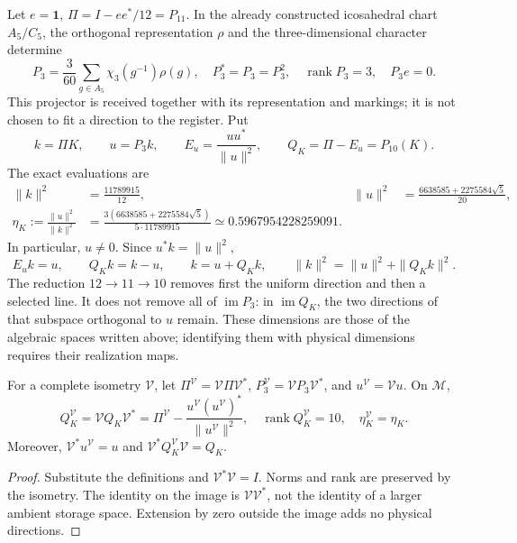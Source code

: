 Let \(e=\mathbf1\), \(\Pi=I-ee^*/12=P_{11}\). In the already constructed
icosahedral chart \(A_5/C_5\), the orthogonal representation
\(\rho\) and the three-dimensional character determine
\begin{equation}
 P_3=\frac3{60}\sum_{g\in A_5}\chi_3(g^{-1})\rho(g),
 \quad P_3^*=P_3=P_3^2,\quad
 \operatorname{rank}P_3=3,\quad P_3e=0.
 \label{x_reciprocidad:lib01:P3}
\end{equation}
This projector is received together with its representation and markings; it is not chosen to fit a direction to the register. Put
\[
 k=\Pi K,\qquad u=P_3k,\qquad
 E_u=\frac{uu^*}{\|u\|^2},\qquad Q_K=\Pi-E_u=P_{10}(K).
\]
The exact evaluations are
\begin{align}
 \|k\|^2&=\frac{11789915}{12},&
 \|u\|^2&=\frac{6638585+2275584\sqrt5}{20},
 \label{x_reciprocidad:lib01:normas-direccion}\\
 \eta_K:=\frac{\|u\|^2}{\|k\|^2}
 &=\frac{3(6638585+2275584\sqrt5)}{5\cdot11789915}
 \simeq0.5967954228259091.
 \label{x_reciprocidad:lib01:eta}
\end{align}
In particular, \(u\ne0\). Since \(u^*k=\|u\|^2\),
\begin{equation}
 E_uk=u,\qquad Q_Kk=k-u,\qquad
 k=u+Q_Kk,\qquad \|k\|^2=\|u\|^2+\|Q_Kk\|^2.
 \label{x_reciprocidad:lib01:particion-direccion}
\end{equation}
The reduction \(12\to11\to10\) removes first the uniform direction and then a selected line. It does not remove all of \(\operatorname{im}P_3\): in \(\operatorname{im}Q_K\), the two directions of that subspace orthogonal to \(u\) remain. These dimensions are those of the algebraic spaces written above; identifying them with physical dimensions requires their realization maps.

\begin{proposition}
\label{x_reciprocidad:lib01:transporte-direccion}
For a complete isometry \(\mathcal V\), let \(\Pi^{\mathcal V}=\mathcal V\Pi\mathcal V^*\), \(P_3^{\mathcal V}=\mathcal VP_3\mathcal V^*\), and \(u^{\mathcal V}=\mathcal Vu\). On \(\mathcal M\),
\[
 Q_K^{\mathcal V}
 =\mathcal VQ_K\mathcal V^*
 =\Pi^{\mathcal V}
 -\frac{u^{\mathcal V}(u^{\mathcal V})^*}{\|u^{\mathcal V}\|^2},
 \quad \operatorname{rank}Q_K^{\mathcal V}=10,
 \quad \eta_K^{\mathcal V}=\eta_K.
\]
Moreover, \(\mathcal V^*u^{\mathcal V}=u\) and \(\mathcal V^*Q_K^{\mathcal V}\mathcal V=Q_K\).
\end{proposition}
\begin{proof}
Substitute the definitions and \(\mathcal V^*\mathcal V=I\). Norms and rank are preserved by the isometry. The identity on the image is \(\mathcal V\mathcal V^*\), not the identity of a larger ambient storage space. Extension by zero outside the image adds no physical directions.
\end{proof}

